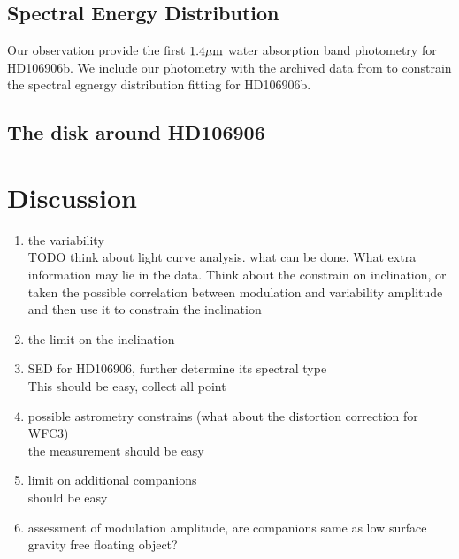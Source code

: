 \documentclass[modern]{aastex62}
\begin{document}
\subsection{Spectral Energy Distribution}
Our observation provide the first $1.4\mbox{$\mu$m}$ water absorption band photometry for HD106906b. We include our photometry with the archived data from \citep{Bailey2013,Kalas2015,Wu2016} to constrain the spectral egnergy distribution fitting for HD106906b.

\subsection{The disk around HD106906}


\section{Discussion}
\begin{enumerate}
\item the variability\\
  TODO think about light curve analysis. what can be done. What extra information may lie in the data. Think about the constrain on inclination, or taken the possible correlation between modulation and variability amplitude and then use it to constrain the inclination
\item the limit on the inclination \citep[see][]{Vos2017}
  
\item SED for HD106906, further determine its spectral type\\
  This should be easy, collect all point
\item possible astrometry constrains (what about the distortion correction for WFC3)\\
  the measurement should be easy
\item limit on additional companions\\
  should be easy
  \item assessment of modulation amplitude, are companions same as low surface gravity free floating object?
  \end{enumerate}



\end{document}
